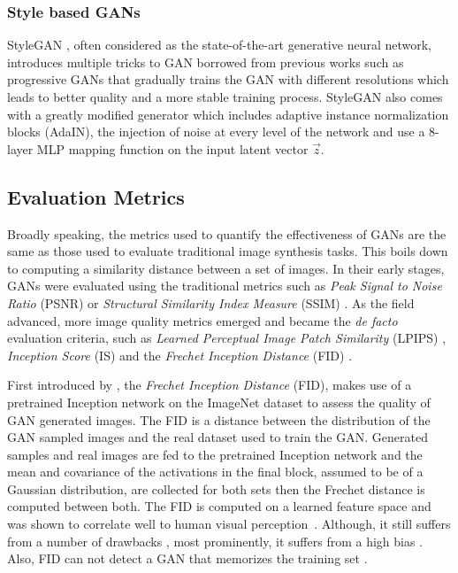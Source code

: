 \documentclass[preprint,12pt, authoryear]{elsarticle}
\begin{document}
\subsubsection{Style based GANs} StyleGAN \citep{Karras2020AnalyzingAI}, often considered as the state-of-the-art generative neural network, introduces multiple tricks to GAN borrowed from previous works such as progressive GANs \citep{karras2018progressive} that gradually trains the GAN with different resolutions which leads to better quality and a more stable training process. StyleGAN also comes with a greatly modified generator which includes adaptive instance normalization blocks (AdaIN), the injection of noise at every level of the network and use a 8-layer MLP mapping function on the input latent vector $\vec z$.

\subsection{Evaluation Metrics}
Broadly speaking, the metrics used to quantify the effectiveness of GANs are the same as those used to evaluate traditional image synthesis tasks. This boils down to computing a similarity distance between a set of images. In their early stages, GANs were evaluated using the traditional metrics such as {\em Peak Signal to Noise Ratio} (PSNR) \citep{Regmi2018CrossViewIS} or {\em Structural Similarity Index Measure} (SSIM) \citep{Odena2017ConditionalIS}. As the field advanced, more image quality metrics emerged and became the {\em de facto} evaluation criteria, such as {\em Learned Perceptual Image Patch Similarity} (LPIPS) \citep{Zhang2018TheUE}, {\em Inception Score} (IS) \citep{Salimans2016ImprovedTF} and the {\em Frechet Inception Distance} (FID) \citep{Heusel2017GANsTB}.

First introduced by \cite{Heusel2017GANsTB}, the {\em Frechet Inception Distance} (FID), makes use of a pretrained Inception network on the ImageNet \citep{deng2009imagenet} dataset to assess the quality of GAN generated images. The FID is a distance between the distribution of the GAN sampled images and the real dataset used to train the GAN. Generated samples and real images are fed to the pretrained Inception network and the mean and covariance of the activations in the final block, assumed to be of a Gaussian distribution,  are collected for both sets then the Frechet distance is computed between both. The FID is computed on a learned feature space and was shown to correlate well to human visual perception~\citep{Zhang2018TheUE}. Although, it still suffers from a number of drawbacks \citep{Borji2019ProsAC}, most prominently, it suffers from a high bias \citep{Binkowski2018DemystifyingMG}. Also, FID can not detect a GAN that memorizes the training set \citep{Lucic2018AreGC}.
\end{document}
